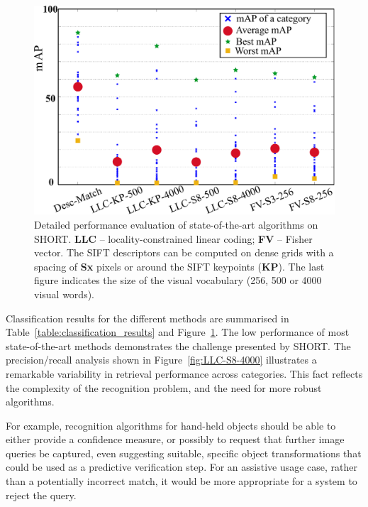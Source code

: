 \begin{figure}[]
\begin{center}
\includegraphics[width=\linewidth]{./gfx/Chapter03/methods-v5.pdf}
\caption{Detailed performance evaluation of state-of-the-art algorithms on SHORT. \textbf{LLC} -- locality-constrained linear coding; \textbf{FV} -- Fisher vector. The SIFT descriptors can be computed on dense grids with a spacing of \textbf{Sx} pixels or around the SIFT keypoints (\textbf{KP}). The last figure indicates the size of the visual vocabulary (256, 500 or 4000 visual words).}
\label{fig:methods}
\end{center}
\end{figure}




Classification results for the different methods are summarised in Table~\ref{table:classification_results}  and Figure~\ref{fig:methods}. The low performance of most state-of-the-art methods demonstrates the challenge presented by SHORT. The precision/recall analysis shown in Figure~\ref{fig:LLC-S8-4000} illustrates a remarkable variability in retrieval performance across categories. This fact reflects the complexity of the recognition problem, and the need for more robust algorithms. 

For example, recognition algorithms for hand-held objects should be able to either provide a confidence measure, or possibly to request that further image queries be captured, even suggesting suitable, specific object transformations that could be used as a predictive verification step. For an assistive usage case, rather than a potentially incorrect match, it would be more appropriate for a system to reject the query.

